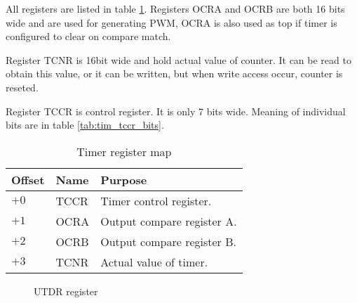 All registers are listed in table \ref{tab:tim_reg_map}. Registers OCRA and OCRB
are both 16 bits wide and are used for generating PWM, OCRA is also used as top
if timer is configured to clear on compare match.

Register TCNR is 16bit wide and hold actual value of counter. It can be read to
obtain this value, or it can be written, but when write access occur, counter is
reseted.

Register TCCR is control register. It is only 7 bits wide. Meaning of individual
bits are in table \ref{tab:tim_tccr_bits}.

\begin{table}[h]
    \centering
    \begin{tabular}{|l|l|l|}
        \hline
        \textbf{Offset} & \textbf{Name} & \textbf{Purpose}           \\ \hline
        $+0$            & TCCR          & Timer control register.    \\ \hline
        $+1$            & OCRA          & Output compare register A. \\ \hline
        $+2$            & OCRB          & Output compare register B. \\ \hline
        $+3$            & TCNR          & Actual value of timer.     \\ \hline
    \end{tabular}
    \caption{Timer register map}
    \label{tab:tim_reg_map}
\end{table}

\begin{figure}[H]
    \centering
    \caption{UTDR register}
    \label{fig:TCCR_reg}
\end{figure}

